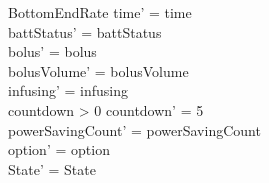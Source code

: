 \begin{schema}{BottomEndRate}
	time' = time\\
	battStatus' = battStatus\\
	bolus' = bolus\\
	bolusVolume' = bolusVolume\\
	infusing' = infusing\\
	countdown > 0 \land countdown' = 5\\
	powerSavingCount' = powerSavingCount\\ 
	option' = option\\
	State' = State\\
\end{schema}

